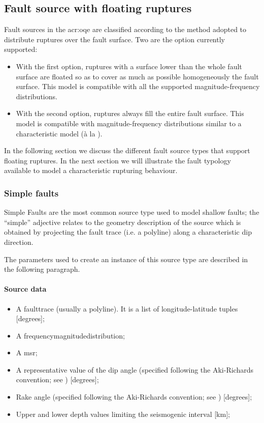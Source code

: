 \subsection{Fault source with floating ruptures}
%
Fault sources in the \gls{acr:oqe} are classified according to the method 
adopted to distribute ruptures over the fault surface.
Two are the option currently supported:
\begin{itemize}
    \item With the first option, ruptures with a surface lower than the 
		whole fault surface are floated so as to cover as much as 
		possible homogeneously the fault surface.
        This model is compatible with all the supported 
        magnitude-frequency distributions.
    \item With the second option, ruptures always fill the entire fault 
		surface. This model is 
        compatible  with magnitude-frequency distributions similar to a
        characteristic model (\`{a} la \cite{schwartz1984}).
\end{itemize}
In the following section we discuss the different fault source types 
that support floating ruptures.
In the next section we will illustrate the fault typology available to 
model a characteristic rupturing behaviour.
%
\subsubsection{Simple faults}
%
Simple Faults are the most common source type used to model shallow 
faults; the ``simple'' adjective relates to the geometry description 
of the source which is obtained by projecting the fault trace 
(i.e. a polyline) along a characteristic dip direction. 

The parameters used to create an instance of this 
source type are described in the following paragraph.
%
\paragraph{Source data}
%
\begin{itemize}
\item A \gls{faulttrace} (usually a polyline). It is a list of 
	longitude-latitude tuples [degrees];
\item A \gls{frequencymagnitudedistribution};
\item A \gls{msr};
\item A representative value of the dip angle (spec\-i\-fied following 
the Aki-Richards convention; see \citet{aki2002}) [degrees];
\item Rake angle (spec\-i\-fied following the Aki-Rich\-ards convention; 
see \citet{aki2002}) [degrees];
\item Upper and lower depth values limiting the seismogenic interval [km];
\end{itemize}


